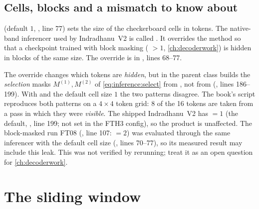 \subsection{Cells, blocks and a mismatch to know about}

\begin{sloppypar}
 (default $1$, , line 77) sets the size of the
checkerboard cells in tokens. The native-band inferencer used by Indradhanu~V2 is called
. It overrides the method  so that a checkpoint
trained with block masking ( $>1$, \cref{ch:decoderwork}) is hidden in blocks of the same
size. The override is in
, lines 68--77.
\end{sloppypar}

\begin{sourcenote}
The override changes which tokens are \emph{hidden}, but  in the parent class builds the
\emph{selection} masks $M^{(1)},M^{(2)}$ of \cref{eq:inference:select} from ,
not from  (, lines 186--199). With 
and the default cell size $1$ the two patterns disagree. The book's script
 reproduces both patterns on a $4\times4$ token grid: 8 of
the 16 tokens are taken from a pass in which they were \emph{visible}. The shipped Indradhanu~V2 has
 $=1$ (the default, , line 199; not set in the
FTH3 config), so the product is unaffected. The block-masked run FT08
(, line 107: 
$=2$) was evaluated through the same inferencer with the default cell size
(, lines 70--77), so its measured result may include this leak. This was not
verified by rerunning; treat it as an open question for \cref{ch:decoderwork}.
\end{sourcenote}

\section{The sliding window}\label{sec:inference:sliding}

